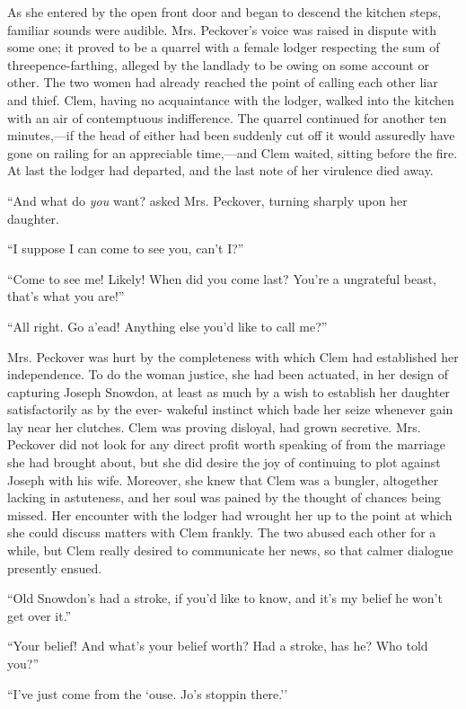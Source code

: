 As she entered by the open front door and began to descend the kitchen
steps, familiar sounds were audible. Mrs. Peckover's voice was raised in
dispute with some one; it proved to be a quarrel with a female lodger
respecting {}the sum of threepence-farthing, alleged by the landlady to
be owing on some account or other. The two women had already reached the
point of calling each other liar and thief. Clem, having no acquaintance
with the lodger, walked into the kitchen with an air of contemptuous
indifference. The quarrel continued for another ten minutes,---if the
head of either had been suddenly cut off it would assuredly have gone on
railing for an appreciable time,---and Clem waited, sitting before the
fire. At last the lodger had departed, and the last note of her
virulence died away.

``And what do \emph{you} want? asked Mrs. Peckover, turning sharply upon
her daughter.

``I suppose I can come to see you, can't I?''

``Come to see me! Likely! When did you come last? You're a ungrateful
beast, that's what you are!''

``All right. Go a'ead! Anything else you'd like to call me?''

Mrs. Peckover was hurt by the completeness with which Clem had
established her independence. To do the woman justice, she had been
actuated, in her design of capturing Joseph Snowdon, at least as much by
a wish {}to establish her daughter satisfactorily as by the ever-
wakeful instinct which bade her seize whenever gain lay near her
clutches. Clem was proving disloyal, had grown secretive. Mrs. Peckover
did not look for any direct profit worth speaking of from the marriage
she had brought about, but she did desire the joy of continuing to plot
against Joseph with his wife. Moreover, she knew that Clem was a
bungler, altogether lacking in astuteness, and her soul was pained by
the thought of chances being missed. Her encounter with the lodger had
wrought her up to the point at which she could discuss matters with Clem
frankly. The two abused each other for a while, but Clem really desired
to communicate her news, so that calmer dialogue presently ensued.

``Old Snowdon's had a stroke, if you'd like to know, and it's my belief
he won't get over it.''

``Your belief! And what's your belief worth? Had a stroke, has he? Who
told you?''

``I've just come from the `ouse. Jo's stoppin there.''

